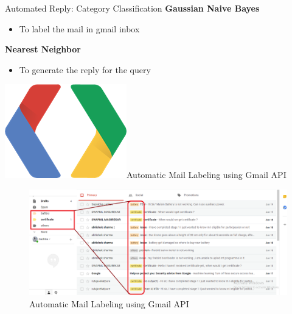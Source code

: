 \documentclass[10pt, a4paper]{beamer}
\newcommand\tabhalf[1][0.5cm]{\hspace*{#1}}
\begin{document}
\begin{frame}{Automated Reply: Category Classification}
\textbf{Gaussian Naive Bayes}
	\begin{itemize}
		\item To label the mail in gmail inbox
	\end{itemize}
\textbf{Nearest Neighbor}
	\begin{itemize}
		\item To generate the reply for the query
	\end{itemize}
\end{frame}

\begin{frame}{\includegraphics[width=0.07 \textwidth, right=0.6cm]{google-developers-logo.png}\tabhalf Automatic Mail Labeling using Gmail API}
  \begin{figure}
   \includegraphics[width=1.13 \textwidth, right=11.1cm]{gmail_labeling.png}
   \caption{Automatic Mail Labeling using Gmail API}
  \end{figure}
\end{frame}
\end{document}
